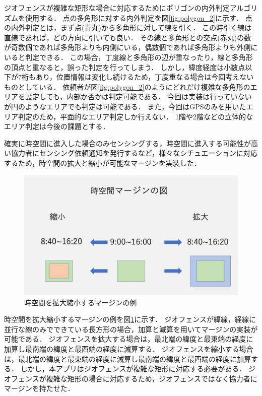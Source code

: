 ジオフェンスが複雑な矩形な場合に対応するためにポリゴンの内外判定アルゴリズム\cite{naigai}を使用する．
点の多角形に対する内外判定を図\ref{fig:polygon_2}に示す．
点の内外判定とは，まず点(青丸)から多角形に対して線を引く．
この時引く線は直線であれば，どの方向に引いても良い．
その線と多角形との交点(赤丸)の数が奇数個であれば多角形よりも内側にいる，偶数個であれば多角形よりも外側にいると判定できる．
この場合，丁度線と多角形の辺が重なったり，線と多角形の頂点と重なると，誤った判定を行ってしまう．
しかし，緯度経度は小数点以下が7桁もあり，位置情報は変化し続けるため，丁度重なる場合は今回考えないものとしている．
依頼者が図\ref{fig:polygon_2}のようにどれだけ複雑な多角形のエリアを設定しても，内部か否かは判定可能である．
今回は実装は行っていないが円のようなエリアでも判定は可能である．
また，今回はGPSのみを用いたエリア判定のため，平面的なエリア判定しか行えない．
1階や2階などの立体的なエリア判定は今後の課題とする．

確実に時空間に進入した場合のみセンシングする，時空間に進入する可能性が高い協力者にセンシング依頼通知を発行するなど，様々なシチュエーションに対応するため，時空間の拡大と縮小が可能なマージンを実装した．

\begin{figure}[tbh]
    \centering
    \includegraphics[width=16cm]{img_margin_1.png}
    \caption{時空間を拡大縮小するマージンの例}
    \label{fig:margin_1}
\end{figure}

時空間を拡大縮小するマージンの例を図\ref{fig:margin_1}に示す．
ジオフェンスが緯線，経線に並行な線のみでできている長方形の場合，加算と減算を用いてマージンの実装が可能である．
ジオフェンスを拡大する場合は，最北端の緯度と最東端の経度に加算し最南端の緯度と最西端の経度に減算する．
ジオフェンスを縮小する場合は，最北端の緯度と最東端の経度に減算し最南端の緯度と最西端の経度に加算する．
しかし，本アプリはジオフェンスが複雑な矩形に対応する必要がある．
ジオフェンスが複雑な矩形の場合に対応するため，ジオフェンスではなく協力者にマージンを持たせた．

